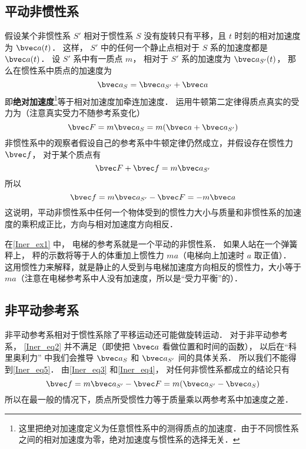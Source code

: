\subsection{平动非惯性系}
假设某个非惯性系 $S'$ 相对于惯性系 $S$ 没有旋转只有平移，且 $t$ 时刻的相对加速度为 $\bvec a(t)$． 这样， $S'$ 中的任何一个静止点相对于 $S$ 系的加速度都是 $\bvec a(t)$． 设 $S'$ 系中有一质点 $m$， 相对于 $S'$ 系的加速度为 $\bvec a_{S'} (t)$， 那么在惯性系中质点的加速度为
\begin{equation}\label{Iner_eq2}
\bvec a_{S} = \bvec a_{S'} + \bvec a
\end{equation}
即\textbf{绝对加速度}\footnote{这里把绝对加速度定义为任意惯性系中的测得质点的加速度．由于不同惯性系之间的相对加速度为零，绝对加速度与惯性系的选择无关．}等于相对加速度加牵连加速度． 运用牛顿第二定律得质点真实的受力为（注意真实受力不随参考系变化）
\begin{equation}\label{Iner_eq3}
\bvec F = m \bvec a_{S} = m(\bvec a + \bvec a_{S'} )
\end{equation}
非惯性系中的观察者假设自己的参考系中牛顿定律仍然成立，并假设存在惯性力 $\bvec f$， 对于某个质点有
\begin{equation}\label{Iner_eq4}
\bvec F + \bvec f = m \bvec a_{S'}
\end{equation}
所以
\begin{equation}\label{Iner_eq5}
\bvec f = m \bvec a_{S'} - \bvec F =  - m\bvec a
\end{equation}
这说明，平动非惯性系中任何一个物体受到的惯性力大小与质量和非惯性系的加速度的乘积成正比，方向与相对加速度方向相反．

在\autoref{Iner_ex1} 中， 电梯的参考系就是一个平动的非惯性系． 如果人站在一个弹簧秤上， 秤的示数将等于人的体重加上惯性力 $ma$（电梯向上加速时 $a$ 取正值）． 这用惯性力来解释，就是静止的人受到与电梯加速度方向相反的惯性力，大小等于 $ma$（注意在电梯参考系中人没有加速度，所以是“受力平衡”的）．

\subsection{非平动参考系}

非平动参考系相对于惯性系除了平移运动还可能做旋转运动． 对于非平动参考系， \autoref{Iner_eq2} 并不满足（即使把 $\bvec a$ 看做位置和时间的函数）， 以后在“科里奥利力” 中我们会推导 $\bvec a_{S}$ 和 $\bvec a_{S'}$ 间的具体关系． 所以我们不能得到\autoref{Iner_eq5}． 由\autoref{Iner_eq3} 和\autoref{Iner_eq4}， 对任何非惯性系都成立的结论只有
\begin{equation}
\bvec f = m \bvec a_{S'} - \bvec F =  m( \bvec a_{S'} - \bvec a_{S})
\end{equation}
所以在最一般的情况下，质点所受惯性力等于质量乘以两参考系中加速度之差．

